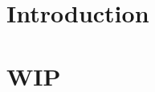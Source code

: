 \documentclass{newrucsthesis}
\begin{document}


\tableofcontents
\printglossaries


\chapter{Introduction}
%

%
%
%
%
%

\chapter{WIP}




\end{document}
